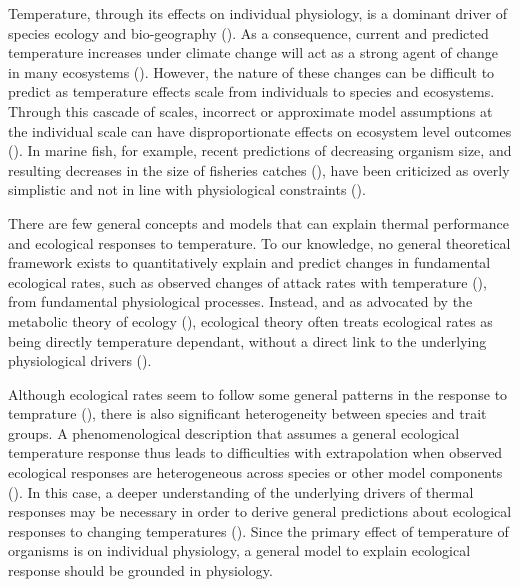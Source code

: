 \documentclass[a4paper, toc=index,abstract=true]{scrartcl}\usepackage[]{graphicx}\usepackage[]{color}
\begin{document}
\begin{spacing}{1.9}
Temperature, through its effects on individual physiology, is a dominant driver of species ecology and bio-geography (\cite{deutsch_climate_2015,pinsky_marine_2013,brown_toward_2004}). As a consequence, current and predicted temperature increases under climate change will act as a strong agent of change in many ecosystems (\cite{deutsch_climate_2015, stuart-smith_thermal_2015, parmesan_globally_2003, walther_ecological_2002}). However, the nature of these changes can be difficult to predict as temperature effects scale from individuals to species and ecosystems. Through this cascade of scales, incorrect or approximate model assumptions at the individual scale can have disproportionate effects on ecosystem level outcomes (\cite{brander_overconfidence_2013, lefevre_models_2017}). In marine fish, for example, recent predictions of decreasing organism size, and resulting decreases in the size of fisheries catches (\cite{cheung_shrinking_2013}), have been criticized as overly simplistic and not in line with physiological constraints (\cite{brander_overconfidence_2013, lefevre_models_2017}).

There are few general concepts and models that can explain thermal performance and ecological responses to temperature. To our knowledge, no general theoretical framework exists to quantitatively explain and predict changes in fundamental ecological rates, such as observed changes of attack rates with temperature (\cite{englund_temperature_2011,rall_universal_2012}), from fundamental physiological processes. Instead, and as advocated by the metabolic theory of ecology (\cite{brown_toward_2004}), ecological theory often treats ecological rates as being directly temperature dependant, without a direct link to the underlying physiological drivers (\cite[e.g., ][]{vucic-pestic_warming_2011, guiet_effects_2016}). 

Although ecological rates seem to follow some general patterns in the response to temprature (\cite{englund_temperature_2011,rall_universal_2012}), there is also significant heterogeneity between species and trait groups. A phenomenological description that assumes a general ecological temperature response thus leads to difficulties with extrapolation when observed ecological responses are heterogeneous across species or other model components (\cite[e.g., fish in marine ecosystem models; ][]{guiet_effects_2016}). In this case, a deeper understanding of the underlying drivers of thermal responses may be necessary in order to derive general predictions about ecological responses to changing temperatures (\cite[e.g., ][]{vucic-pestic_warming_2011}). Since the primary effect of temperature of organisms is on individual physiology, a general model to explain ecological response should be grounded in physiology.


\end{spacing}
\end{document}
